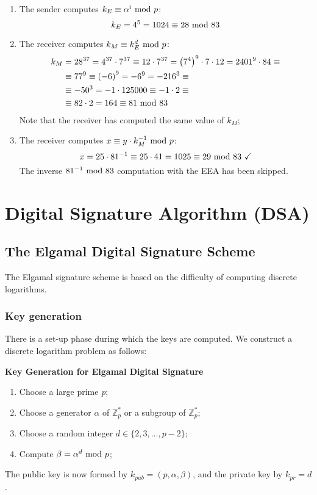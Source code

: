 \begin{enumerate}
    \item The sender computes $k_E\equiv\alpha^i\text{ mod } p$:
    $$k_E=4^5=1024\equiv28\text{ mod }83$$
    \item The receiver computes $k_M\equiv k_E^d\text{ mod } p$:
    \begin{align*}
        k_M&=28^{37}=4^{37}\cdot7^{37}\equiv12\cdot7^{37}=\left(7^4\right)^9\cdot 7\cdot12=2401^9\cdot84\equiv\\
        &\equiv77^9\equiv\left(-6\right)^9=-6^9=-216^3\equiv\\
        &\equiv-50^3=-1\cdot125000\equiv -1\cdot 2\equiv\\
        &\equiv82\cdot2=164\equiv81\text{ mod }83
    \end{align*}
    Note that the receiver has computed the same value of $k_M$;
    \item The receiver computes $x\equiv y\cdot k_M^{-1}\text{ mod } p$:
    $$x=25\cdot81^{-1}\equiv25\cdot41=1025\equiv29\text{ mod }83\text{ \checkmark}$$
    The inverse $81^{-1}\text{ mod }83$ computation with the EEA has been skipped.
\end{enumerate}

\newpage
\section{Digital Signature Algorithm (DSA)}
\subsection{The Elgamal Digital Signature Scheme}
The Elgamal signature scheme is based on the difficulty of computing discrete logarithms.

\subsubsection{Key generation}
There is a set-up phase during which the keys are computed. We construct a discrete logarithm problem as follows:
\begin{framed}
    \hfill\break\textbf{Key Generation for Elgamal Digital Signature}
    \begin{enumerate}
        \item Choose a large prime \textit{p};
        \item Choose a generator $\alpha$ of $\mathbb{Z}_p^*$ or a subgroup of $\mathbb{Z}_p^*$;
        \item Choose a random integer $d\in\{2,3,...,p-2\}$;
        \item Compute $\beta=\alpha^d\text{ mod } p$;
    \end{enumerate}
\end{framed}
The public key is now formed by $k_{pub}=(p,\alpha,\beta)$, and the private key by $k_{pr}=d$.

